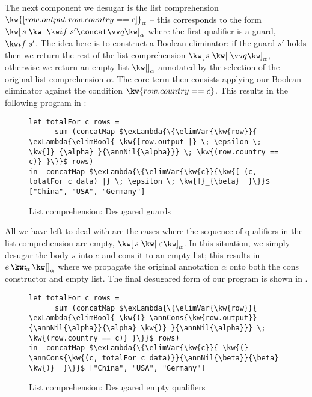 \noindent
The next component we desugar is the list comprehension $\kw{[ row.output | row.country == c ]}_{\alpha}$ -- this corresponds to the form $\annListComp{s}{\qualGuard{s'} \concat \vec{q}}{\alpha}$ where the first qualifier is a guard, $\qualGuard{s'}$. The idea here is to construct a Boolean eliminator: if the guard $s'$ holds then we return the rest of the list comprehension $\annListComp{s}{\vec{q}}{\alpha}$, otherwise we return an empty list $\annNil{\alpha}$ annotated by the selection of the original list comprehension $\alpha$. The core term then consists applying our Boolean eliminator against the condition $\kw{row.country == c}$. This results in the following program in :

\begin{figure}[H]
   \small
\begin{lstlisting}
let totalFor c rows =
      sum (concatMap $\exLambda{\{\elimVar{\kw{row}}{  \exLambda{\elimBool{ \kw{[row.output |} \; \epsilon \; \kw{]}_{\alpha} }{\annNil{\alpha}}} \; \kw{(row.country == c)} }\}}$ rows)
in  concatMap $\exLambda{\{\elimVar{\kw{c}}{\kw{[ (c, totalFor c data) |} \; \epsilon \; \kw{]}_{\beta}  }\}}$ ["China", "USA", "Germany"]
\end{lstlisting}
   \caption{List comprehension: Desugared guards}
   \label{fig:surface-language:example-3}
\end{figure}

\noindent
All we have left to deal with are the cases where the sequence of qualifiers in the list comprehension are empty, $\annListComp{s}{\seqEmpty}{\alpha}$. In this situation, we simply desugar the body $s$ into $e$ and cons it to an empty list; this results in $\annCons{e}{\annNil{\alpha}}{\alpha}$ where we propagate the original annotation $\alpha$ onto both the cons constructor and empty list. The final desugared form of our program is shown in .

\begin{figure}[H]
\small
\begin{lstlisting}
let totalFor c rows =
      sum (concatMap $\exLambda{\{\elimVar{\kw{row}}{  \exLambda{\elimBool{ \kw{(} \annCons{\kw{row.output}}{\annNil{\alpha}}{\alpha} \kw{)} }{\annNil{\alpha}}} \; \kw{(row.country == c)} }\}}$ rows)
in  concatMap $\exLambda{\{\elimVar{\kw{c}}{ \kw{(} \annCons{\kw{(c, totalFor c data)}}{\annNil{\beta}}{\beta} \kw{)}  }\}}$ ["China", "USA", "Germany"]
\end{lstlisting}
\caption{List comprehension: Desugared empty qualifiers}
\label{fig:surface-language:example-4}
\end{figure}

